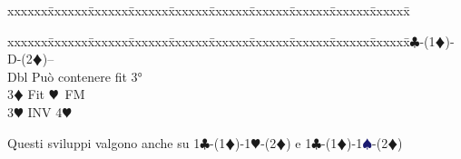 \documentclass[a4paper,italian]{article}
\newcommand{\BC}{\textcolor{OliveGreen}{$\clubsuit$}}
\newcommand{\BD}{\textcolor{RedOrange}{$\vardiamondsuit$}}
\newcommand{\BH}{\textcolor{Red2}{$\varheartsuit${}}}
\newcommand{\BS}{\textcolor{MidnightBlue}{$\spadesuit${}}}
\newenvironment{bidtable}
{\begin{tabbing}

    xxxxxx\=xxxxxx\=xxxxxx\=xxxxxx\=xxxxxx\=xxxxxx\=xxxxxx\=xxxxxx\=xxxxxx\=xxxxxx\=\kill}
{\end{tabbing} }%
\newenvironment{sviluppi}
{\begin{tcolorbox}[colframe=azzurro,title=Sviluppi particolari]}
    {
\end{tcolorbox} }%
\begin{document}
\begin{multicols}{2}
\begin{bidtable}
                                        \end{bidtable}
                                        \begin{sviluppi}
                                            \begin{bidtable}
                                                1\BC-(1\BD)-D-(2\BD)--\+\\
                                                Dbl \> Può contenere fit 3°\\
                                                3\BD \> Fit \BH\ FM\\
                                                3\BH \> INV 4\BH \-
                                            \end{bidtable}
                                            \smallbreak
                                            Questi sviluppi valgono anche su 1\BC -(1\BD )-1\BH -(2\BD ) e 1\BC -(1\BD )-1\BS -(2\BD )
                                        \end{sviluppi}




\end{multicols}
\end{document}
